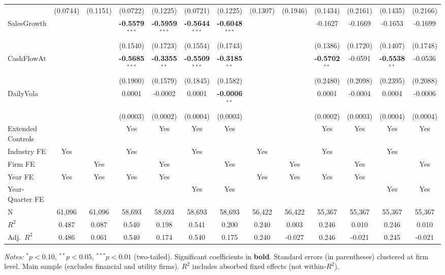 \documentclass[11pt,a4paper]{article}
\begin{document}
\begin{table}[htbp]
\begin{tabular}{lcccccccccccc}
 & (0.0744) & (0.1151) & (0.0722) & (0.1225) & (0.0721) & (0.1225) & (0.1307) & (0.1946) & (0.1434) & (0.2161) & (0.1435) & (0.2166) \\
SalesGrowth &  &  & \textbf{-0.5579}$^{***}$ & \textbf{-0.5959}$^{***}$ & \textbf{-0.5644}$^{***}$ & \textbf{-0.6048}$^{***}$ &  &  & -0.1627 & -0.1669 & -0.1653 & -0.1699 \\
 &  &  & (0.1540) & (0.1723) & (0.1554) & (0.1743) &  &  & (0.1386) & (0.1720) & (0.1407) & (0.1748) \\
CashFlowAt &  &  & \textbf{-0.5685}$^{***}$ & \textbf{-0.3355}$^{**}$ & \textbf{-0.5509}$^{***}$ & \textbf{-0.3185}$^{**}$ &  &  & \textbf{-0.5702}$^{**}$ & -0.0591 & \textbf{-0.5538}$^{**}$ & -0.0536 \\
 &  &  & (0.1900) & (0.1579) & (0.1845) & (0.1582) &  &  & (0.2480) & (0.2098) & (0.2395) & (0.2088) \\
DailyVola &  &  & 0.0001 & -0.0002 & 0.0001 & \textbf{-0.0006}$^{**}$ &  &  & 0.0001 & -0.0004 & 0.0004 & -0.0006 \\
 &  &  & (0.0003) & (0.0002) & (0.0004) & (0.0003) &  &  & (0.0002) & (0.0003) & (0.0004) & (0.0004) \\
\midrule
Extended Controls &  &  & Yes & Yes & Yes & Yes &  &  & Yes & Yes & Yes & Yes \\
Industry FE & Yes &  & Yes &  & Yes &  & Yes &  & Yes &  & Yes &  \\
Firm FE &  & Yes &  & Yes &  & Yes &  & Yes &  & Yes &  & Yes \\
Year FE & Yes & Yes & Yes & Yes &  &  & Yes & Yes & Yes & Yes &  &  \\
Year-Quarter FE &  &  &  &  & Yes & Yes &  &  &  &  & Yes & Yes \\
\midrule
N & 61,096 & 61,096 & 58,693 & 58,693 & 58,693 & 58,693 & 56,422 & 56,422 & 55,367 & 55,367 & 55,367 & 55,367 \\
$R^2$ & 0.487 & 0.087 & 0.540 & 0.198 & 0.541 & 0.200 & 0.240 & 0.003 & 0.246 & 0.010 & 0.246 & 0.010 \\
Adj.~$R^2$ & 0.486 & 0.061 & 0.540 & 0.174 & 0.540 & 0.175 & 0.240 & -0.027 & 0.246 & -0.021 & 0.245 & -0.021 \\
\bottomrule
\end{tabular}
\begin{minipage}{\linewidth}
\vspace{2pt}\scriptsize
\textit{Notes:} $^{*}p<0.10$, $^{**}p<0.05$, $^{***}p<0.01$ (two-tailed).
 Significant coefficients in \textbf{bold}.
 Standard errors (in parentheses) clustered at firm level.
 Main sample (excludes financial and utility firms).
 $R^2$ includes absorbed fixed effects (not within-$R^2$).
\end{minipage}
\end{table}
\end{document}
